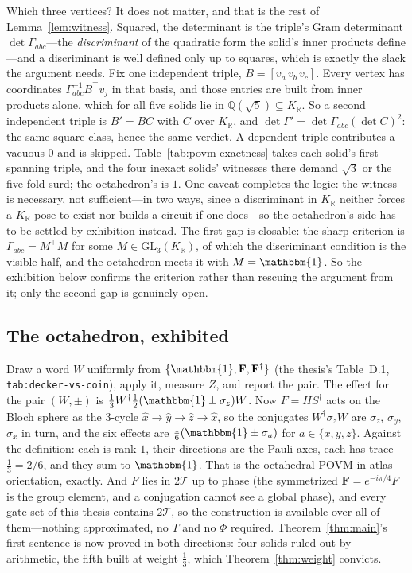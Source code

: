 \documentclass[11pt,a4paper]{article}
\newcommand{\R}{\mathbb{R}}
\newcommand{\Id}{\mathbbm{1}}
\newcommand{\sigmaz}{\sigma_z}
\newcommand{\Tgroup}{\mathcal{T}}
\newcommand{\TwoT}{2\Tgroup}
\begin{document}
Which three vertices? It does not matter, and that is the rest of Lemma~\ref{lem:witness}. Squared, the determinant is the triple's Gram determinant $\det\Gamma_{abc}$---the \textit{discriminant} of the quadratic form the solid's inner products define---and a discriminant is well defined only up to squares, which is exactly the slack the argument needs. Fix one independent triple, $B = [v_a\,v_b\,v_c]$. Every vertex has coordinates $\Gamma_{abc}^{-1}B^{\top}v_j$ in that basis, and those entries are built from inner products alone, which for all five solids lie in $\mathbb{Q}(\sqrt{5}) \subseteq K_\R$. So a second independent triple is $B' = BC$ with $C$ over $K_\R$, and $\det\Gamma' = \det\Gamma_{abc}(\det C)^2$: the same square class, hence the same verdict. A dependent triple contributes a vacuous $0$ and is skipped. Table~\ref{tab:povm-exactness} takes each solid's first spanning triple, and the four inexact solids' witnesses there demand $\sqrt{3}$ or the five-fold surd; the octahedron's is $1$. One caveat completes the logic: the witness is necessary, not sufficient---in two ways, since a discriminant in $K_\R$ neither forces a $K_\R$-pose to exist nor builds a circuit if one does---so the octahedron's side has to be settled by exhibition instead. The first gap is closable: the sharp criterion is $\Gamma_{abc} = M^{\top}M$ for some $M \in \mathrm{GL}_3(K_\R)$, of which the discriminant condition is the visible half, and the octahedron meets it with $M = \Id$. So the exhibition below confirms the criterion rather than rescuing the argument from it; only the second gap is genuinely open.

\subsection{The octahedron, exhibited}

Draw a word $W$ uniformly from $\{\Id, \mathbf{F}, \mathbf{F}^\dagger\}$ (the thesis's Table~D.1, \texttt{tab:decker-vs-coin}), apply it, measure $Z$, and report the pair. The effect for the pair $(W, \pm)$ is $\tfrac{1}{3}W^\dagger\tfrac{1}{2}(\Id \pm \sigmaz)W$. Now $F = HS^\dagger$ acts on the Bloch sphere as the $3$-cycle $\hat x \to \hat y \to \hat z \to \hat x$, so the conjugates $W^\dagger\sigmaz W$ are $\sigmaz$, $\sigma_y$, $\sigma_x$ in turn, and the six effects are $\tfrac{1}{6}(\Id \pm \sigma_a)$ for $a \in \{x, y, z\}$. Against the definition: each is rank $1$, their directions are the Pauli axes, each has trace $\tfrac{1}{3} = 2/6$, and they sum to $\Id$. That is the octahedral POVM in atlas orientation, exactly. And $F$ lies in $\TwoT$ up to phase (the symmetrized $\mathbf{F} = e^{-i\pi/4}F$ is the group element, and a conjugation cannot see a global phase), and every gate set of this thesis contains $\TwoT$, so the construction is available over all of them---nothing approximated, no $T$ and no $\Phi$ required. Theorem~\ref{thm:main}'s first sentence is now proved in both directions: four solids ruled out by arithmetic, the fifth built at weight $\tfrac13$, which Theorem~\ref{thm:weight} convicts.
\end{document}
